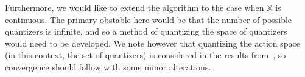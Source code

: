\documentclass{article}
\begin{document}
Furthermore, we would like to extend the algorithm to the case when \( \mathbb{X} \) is continuous. The primary obstable here would be that the number of possible quantizers is infinite, and so a method of quantizing the space of quantizers would need to be developed. We note however that quantizing the action space (in this context, the set of quantizers) is considered in the results from~\cite{Kara}, so convergence should follow with some minor alterations.

\printbibliography %
\end{document}

